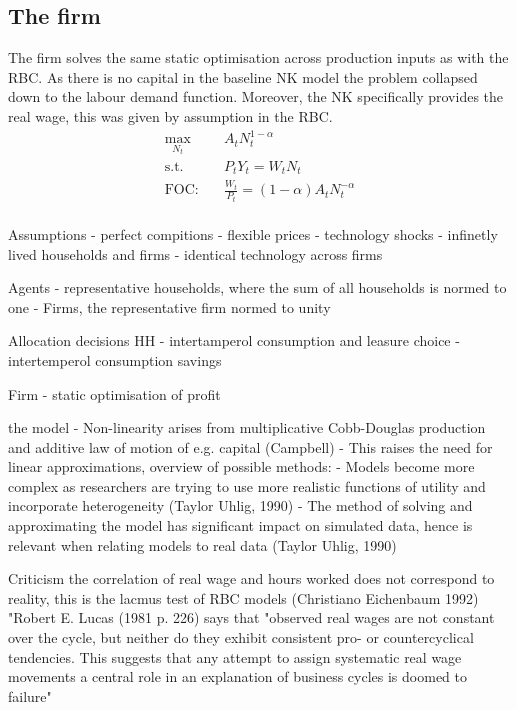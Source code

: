\documentclass[12pt,a4paper,english]{article} %
\begin{document}
	\subsection{The firm}
	The firm solves the same static optimisation across production inputs as with the RBC. As there is no capital in the baseline NK model the problem collapsed down to the labour demand function. Moreover, the NK specifically provides the real wage, this was given by assumption in the RBC.
	\begin{equation}
		\begin{aligned}
			\max_{N_t} \quad & A_t N_t^{1 - \alpha} \\
			\textrm{s.t.} \quad & P_t Y_t = W_t N_t\\
			\textrm{FOC:} \quad & \frac{W_t}{P_t} = (1 - \alpha) A_t N_t^{-\alpha}\\
		\end{aligned}
	\end{equation}
	
	Assumptions
	- perfect compitions
	- flexible prices
	- technology shocks
	- infinetly lived households and firms
	- identical technology across firms
	
	Agents
	- representative households, where the sum of all households is normed to one
	- Firms, the representative firm normed to unity
	
	Allocation decisions
	HH
	- intertamperol consumption and leasure choice
	- intertemperol consumption savings 
	
	Firm
	- static optimisation of profit
	
	
	the model
	-	Non-linearity arises from multiplicative Cobb-Douglas production and additive law of motion of e.g. capital (Campbell)
	- This raises the need for linear approximations, overview of possible methods:
	- Models become more complex as researchers are trying to use more realistic functions of utility and incorporate heterogeneity (Taylor  Uhlig, 1990)
	- The method of solving and approximating the model has significant impact on simulated data, hence is relevant when relating models to real data (Taylor  Uhlig, 1990)
	
	

	
	
	Criticism
	the correlation of real wage and hours worked does not correspond to reality, this is the lacmus test of RBC models (Christiano Eichenbaum 1992)
	"Robert E. Lucas (1981 p. 226) says that "observed real wages are not constant over the cycle, but neither do they exhibit consistent pro- or countercyclical tendencies. This suggests that any attempt to assign systematic real wage movements a central role in an explanation of business cycles is doomed to failure" \cite{christiano_current_1992}
	
\end{document}
